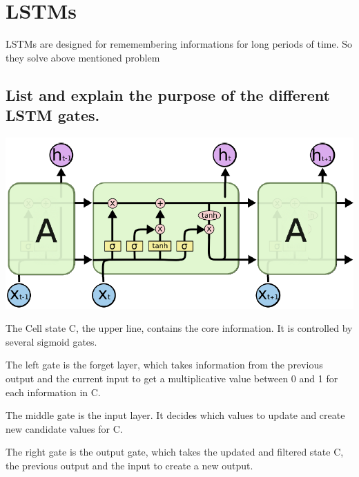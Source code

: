 \section{LSTMs}
\vspace{-0.4cm}
LSTMs are designed for rememembering informations for long periods of time. So they solve above mentioned problem
\vspace{-0.4cm}
\subsection{List and explain the purpose of the different LSTM gates.}
\begin{minipage}{0.4\textwidth}
\includegraphics[width=\textwidth]{./img/lstm.png}
\end{minipage}
\begin{minipage}{0.6\textwidth}
The Cell state C, the upper line, contains the core information. It is controlled by several
sigmoid gates. 

The left gate is the forget layer, which takes information from the previous output and the current input to get a multiplicative value between 0 and 1 for each information in C.

The middle gate is the input layer. It decides which values to update and create new candidate values for C.

The right gate is the output gate, which takes the updated and filtered state C, the previous output and the input to create a new output.
\end{minipage}
